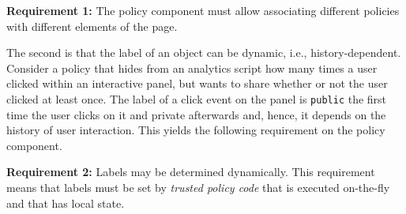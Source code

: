 \medskip
\noindent \textbf{Requirement 1:} The policy component must allow
associating different policies with different elements of the page.
\medskip

The second is that the label of an object can be dynamic, i.e.,
history-dependent. Consider a policy that hides from an analytics
script how many times a user clicked within an interactive panel, but
wants to share whether or not the user clicked at least once. The
label of a click event on the panel is \texttt{public} the first time
the user clicks on it and private afterwards and, hence, it depends on
the history of user interaction. This yields the following requirement
on the policy component.

\medskip
\noindent \textbf{Requirement 2:} Labels may be determined
dynamically. This requirement means that labels must be set by
\emph{trusted policy code} that is executed on-the-fly and that has
local state.
\medskip



